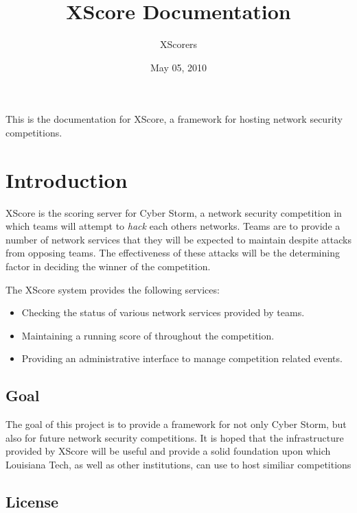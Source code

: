 \documentclass[letterpaper,10pt,english]{manual}
\title{XScore Documentation}
\date{May 05, 2010}
\author{XScorers}
\begin{document}
\maketitle
\tableofcontents



This is the documentation for XScore, a framework for hosting network security competitions.

\resetcurrentobjects
\hypertarget{--doc-Introduction}{}

\chapter{Introduction}

XScore is the scoring server for Cyber Storm, a network security
competition in which teams will attempt to \emph{hack} each others
networks.  Teams are to provide a number of network services that
they will be expected to maintain despite attacks from opposing teams.
The effectiveness of these attacks will be the determining factor in
deciding the winner of the competition.

The XScore system provides the following services:
\begin{itemize}
\item {} 
Checking the status of various network services provided by teams.

\item {} 
Maintaining a running score of throughout the competition.

\item {} 
Providing an administrative interface to manage competition related events.

\end{itemize}


\section{Goal}

The goal of this project is to provide a framework for not only Cyber Storm, but also
for future network security competitions.  It is hoped that the infrastructure provided
by XScore will be useful and provide a solid foundation upon which Louisiana Tech, as well
as other institutions, can use to host similiar competitions


\section{License}
\end{document}
